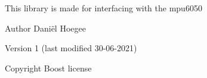 This library is made for interfacing with the mpu6050  \begin{DoxyAuthor}{Author}
Daniël Hoegee 
\end{DoxyAuthor}
\begin{DoxyVersion}{Version}
1 (last modified 30-\/06-\/2021) 
\end{DoxyVersion}
\begin{DoxyCopyright}{Copyright}
Boost license 
\end{DoxyCopyright}
